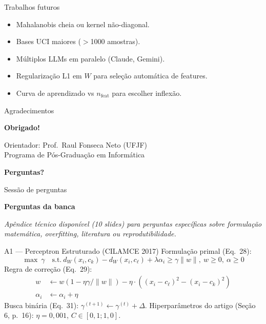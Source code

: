 \documentclass[aspectratio=169,10pt]{beamer}
\begin{document}
\begin{frame}{Trabalhos futuros}
  \footnotesize
  \begin{itemize}
    \item Mahalanobis cheia ou kernel n\~ao-diagonal.
    \item Bases UCI maiores ($>$1000 amostras).
    \item M\'ultiplos LLMs em paralelo (Claude, Gemini).
    \item Regulariza\c{c}\~ao L1 em $W$ para sele\c{c}\~ao autom\'atica de features.
    \item Curva de aprendizado vs $n_{\text{feat}}$ para escolher inflex\~ao.
  \end{itemize}
\end{frame}

\begin{frame}{Agradecimentos}
  \footnotesize
  \begin{center}
    \Large \textbf{Obrigado!}
    \medskip

    \normalsize
    Orientador: Prof.\ Raul Fonseca Neto (UFJF)\\
    Programa de P\'os-Gradua\c{c}\~ao em Inform\'atica
    \medskip

    \large \textbf{Perguntas?}
  \end{center}
\end{frame}

\begin{frame}{Sess\~ao de perguntas}
  \footnotesize
  \begin{center}
    \Large \textbf{Perguntas da banca}
  \end{center}
  \medskip
  \emph{Ap\^endice t\'ecnico dispon\'ivel (10 slides) para perguntas espec\'ificas sobre formula\c{c}\~ao matem\'atica, overfitting, literatura ou reprodutibilidade.}
\end{frame}


\begin{frame}{A1 --- Perceptron Estruturado (CILAMCE 2017)}
  \scriptsize
  Formula\c{c}\~ao primal (Eq.\ 28):
  \[ \max\ \gamma \quad \text{s.t.}\ d_W(x_i,c_k) - d_W(x_i,c_\ell) + \lambda\alpha_i \geq \gamma\|w\|,\ w \geq 0,\ \alpha \geq 0 \]
  Regra de corre\c{c}\~ao (Eq.\ 29):
  \begin{align*}
    w &\leftarrow w(1 - \eta\gamma/\|w\|) - \eta \cdot ((x_i-c_\ell)^2 - (x_i-c_k)^2) \\
    \alpha_i &\leftarrow \alpha_i + \eta
  \end{align*}
  Busca bin\'aria (Eq.\ 31): $\gamma^{(t+1)} \leftarrow \gamma^{(t)} + \Delta$. Hiperpar\^ametros do artigo (Se\c{c}\~ao 6, p.\ 16): $\eta=0{,}001$, $C \in [0{,}1; 1{,}0]$.
\end{frame}
\end{document}
